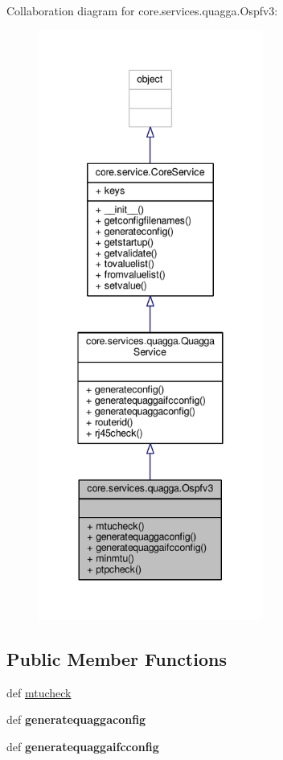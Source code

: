Collaboration diagram for core.\+services.\+quagga.\+Ospfv3\+:
\nopagebreak
\begin{figure}[H]
\begin{center}
\leavevmode
\includegraphics[height=550pt]{classcore_1_1services_1_1quagga_1_1_ospfv3__coll__graph}
\end{center}
\end{figure}
\subsection*{Public Member Functions}
\begin{DoxyCompactItemize}
\item 
def \hyperlink{classcore_1_1services_1_1quagga_1_1_ospfv3_a4536249dfa4ec38e3ea05c2e2bea9287}{mtucheck}
\item 
\hypertarget{classcore_1_1services_1_1quagga_1_1_ospfv3_a31f08d24e8561b95d66f9c35e8706953}{def {\bfseries generatequaggaconfig}}\label{classcore_1_1services_1_1quagga_1_1_ospfv3_a31f08d24e8561b95d66f9c35e8706953}

\item 
\hypertarget{classcore_1_1services_1_1quagga_1_1_ospfv3_a815847817f11bfab40fa72a10e1a3733}{def {\bfseries generatequaggaifcconfig}}\label{classcore_1_1services_1_1quagga_1_1_ospfv3_a815847817f11bfab40fa72a10e1a3733}

\end{DoxyCompactItemize}
